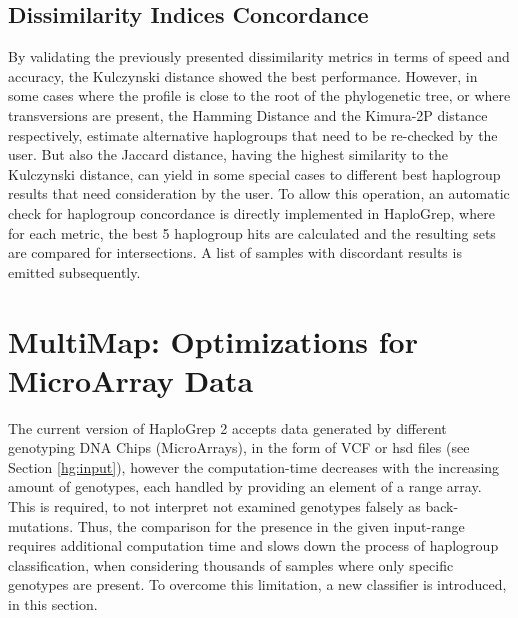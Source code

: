 \subsection{Dissimilarity Indices Concordance }
By validating the previously presented dissimilarity metrics in terms of speed and accuracy, the Kulczynski distance showed the best performance. However, in some cases where the profile is close to the root of the phylogenetic tree, or where transversions are present, the Hamming Distance and the Kimura-2P distance respectively, estimate alternative haplogroups that need to be re-checked by the user. But also the Jaccard distance, having the highest similarity to the Kulczynski distance, can yield in some special cases to different best haplogroup results that need consideration by the user. To allow this operation, an automatic check for haplogroup concordance is directly implemented in HaploGrep, where for each metric, the best 5 haplogroup hits are calculated and the resulting sets are compared for intersections. A list of samples with discordant results is emitted subsequently. 

\section{MultiMap: Optimizations for MicroArray Data}\label{hg:optimization}
The current version of HaploGrep 2 accepts data generated by different genotyping DNA Chips (MicroArrays), in the form of VCF or hsd files (see Section \ref{hg:input}), however the computation-time decreases with the increasing amount of genotypes, each handled by providing an element of a range array. This is required, to not interpret not examined genotypes falsely as back-mutations. Thus, the comparison for the presence in the given input-range requires additional computation time and slows down the process of haplogroup classification, when considering thousands of samples where only specific genotypes are present. To overcome this limitation, a new classifier is introduced, in this section. 
